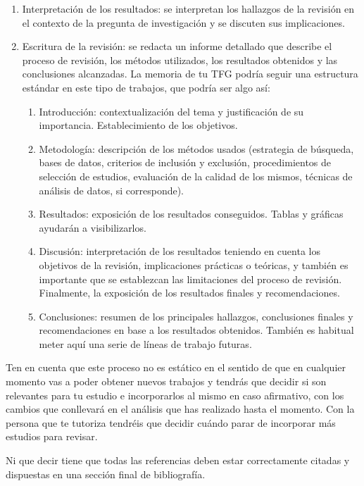 \begin{enumerate}
\item Interpretación de los resultados: se interpretan los hallazgos de la revisión en el contexto de la pregunta de investigación y se discuten sus implicaciones.

\item Escritura de la revisión: se redacta un informe detallado que describe el proceso de revisión, los métodos utilizados, los resultados obtenidos y las conclusiones alcanzadas. La memoria de tu TFG podría seguir una estructura estándar en este tipo de trabajos, que podría ser algo así:

\begin{enumerate}
\item Introducción: contextualización del tema y justificación de su importancia. Establecimiento de los objetivos.
\item Metodología: descripción de los métodos usados (estrategia de búsqueda, bases de datos, criterios de inclusión y exclusión, procedimientos de selección de estudios, evaluación de la calidad de los mismos, técnicas de análisis de datos, si corresponde).
\item Resultados: exposición de los resultados conseguidos. Tablas y gráficas ayudarán a visibilizarlos.
\item Discusión: interpretación de los resultados teniendo en cuenta los objetivos de la revisión, implicaciones prácticas o teóricas, y también es importante que se establezcan las limitaciones del proceso de revisión. Finalmente, la exposición de los resultados finales y recomendaciones. 
\item Conclusiones: resumen de los principales hallazgos, conclusiones finales y recomendaciones en base a los resultados obtenidos. También es habitual meter aquí una serie de líneas de trabajo futuras. 
\end{enumerate}
\end{enumerate}

Ten en cuenta que este proceso no es estático en el sentido de que en cualquier momento vas a poder obtener nuevos trabajos y tendrás que decidir si son relevantes para tu estudio e incorporarlos al mismo en caso afirmativo, con los cambios que conllevará en el análisis que has realizado hasta el momento. Con la persona que te tutoriza tendréis que decidir cuándo parar de incorporar más estudios para revisar.

Ni que decir tiene que todas las referencias deben estar correctamente citadas y dispuestas en una sección final de bibliografía.

